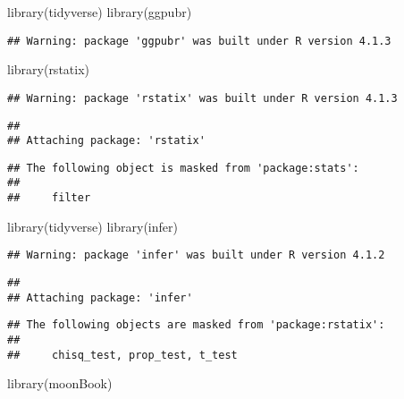 \documentclass[
]{article}
\newenvironment{Shaded}{\begin{snugshade}}{\end{snugshade}}
\newcommand{\FunctionTok}[1]{\textcolor[rgb]{0.00,0.00,0.00}{#1}}
\newcommand{\NormalTok}[1]{#1}
\begin{document}
\begin{Shaded}
\begin{Highlighting}[]
\FunctionTok{library}\NormalTok{(tidyverse)}
\FunctionTok{library}\NormalTok{(ggpubr)}
\end{Highlighting}
\end{Shaded}

\begin{verbatim}
## Warning: package 'ggpubr' was built under R version 4.1.3
\end{verbatim}

\begin{Shaded}
\begin{Highlighting}[]
\FunctionTok{library}\NormalTok{(rstatix)}
\end{Highlighting}
\end{Shaded}

\begin{verbatim}
## Warning: package 'rstatix' was built under R version 4.1.3
\end{verbatim}

\begin{verbatim}
## 
## Attaching package: 'rstatix'
\end{verbatim}

\begin{verbatim}
## The following object is masked from 'package:stats':
## 
##     filter
\end{verbatim}

\begin{Shaded}
\begin{Highlighting}[]
\FunctionTok{library}\NormalTok{(tidyverse)}
\FunctionTok{library}\NormalTok{(infer)}
\end{Highlighting}
\end{Shaded}

\begin{verbatim}
## Warning: package 'infer' was built under R version 4.1.2
\end{verbatim}

\begin{verbatim}
## 
## Attaching package: 'infer'
\end{verbatim}

\begin{verbatim}
## The following objects are masked from 'package:rstatix':
## 
##     chisq_test, prop_test, t_test
\end{verbatim}

\begin{Shaded}
\begin{Highlighting}[]
\FunctionTok{library}\NormalTok{(moonBook)}
\end{Highlighting}
\end{Shaded}
\end{document}
